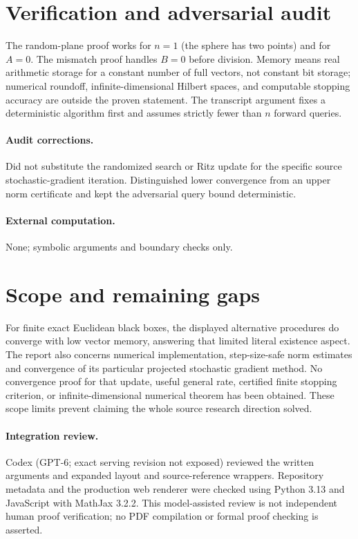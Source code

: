\documentclass[11pt]{article}
\begin{document}
\section{Verification and adversarial audit}

The random-plane proof works for $n=1$ (the sphere has two points) and for $A=0$.
The mismatch proof handles $B=0$ before division. Memory means real arithmetic
storage for a constant number of full vectors, not constant bit storage; numerical
roundoff, infinite-dimensional Hilbert spaces, and computable stopping accuracy
are outside the proven statement. The transcript argument fixes a deterministic
algorithm first and assumes strictly fewer than $n$ forward queries.

\paragraph{Audit corrections.} Did not substitute the randomized search or Ritz update for the specific
source stochastic-gradient iteration. Distinguished lower convergence from an
upper norm certificate and kept the adversarial query bound deterministic.
\paragraph{External computation.} None; symbolic arguments and boundary checks only.
\section{Scope and remaining gaps}

For finite exact Euclidean black boxes, the displayed alternative procedures do
converge with low vector memory, answering that limited literal existence aspect.
The report also concerns numerical implementation, step-size-safe norm estimates
and convergence of its particular projected stochastic gradient method. No
convergence proof for that update, useful general rate, certified finite stopping
criterion, or infinite-dimensional numerical theorem has been obtained. These
scope limits prevent claiming the whole source research direction solved.

\paragraph{Integration review.} Codex (GPT-6; exact serving revision not exposed) reviewed the written arguments and expanded layout and source-reference wrappers. Repository metadata and the production web renderer were checked using Python 3.13 and JavaScript with MathJax 3.2.2. This model-assisted review is not independent human proof verification; no PDF compilation or formal proof checking is asserted.
\end{document}
